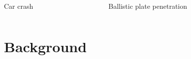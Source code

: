 \documentclass{beamer}
\begin{document}
\begin{frame}
\begin{columns}[t]
\begin{column}[t]{5cm}
          \begin{center}
          \small{Car crash}
          \end{center}
          
     \end{column}
       \begin{column}[B]{5cm} %

         \begin{center}
          \small{Ballistic plate penetration\footnotemark}
          \end{center}
          
  
     \end{column}
     \end{columns}
     
     
  \centering
  
  
\end{frame}
%
\section{Background}
%
\end{document}
